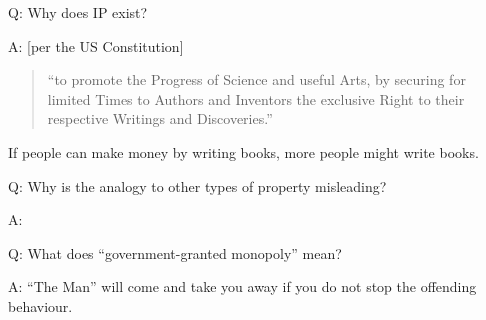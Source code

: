 \begin{frame}
\Large
\begin{changemargin}{0.5cm}
Q: Why does IP exist?

\noindent
A: [per the US Constitution]
\begin{quote}
``to promote the Progress of Science and useful Arts, by securing for limited Times to Authors and Inventors the exclusive Right to their respective Writings and Discoveries.''
\end{quote}

\noindent
If people can make money by writing books, more people might write books.
\end{changemargin}
\end{frame}

\begin{frame}
\large
\begin{changemargin}{0.5cm}
\noindent
Q: Why is the analogy to other types of property misleading?

\noindent
A:

\end{changemargin}
\end{frame}


\begin{frame}
\Large
\begin{changemargin}{1.5cm}
\noindent
Q: What does ``government-granted monopoly'' mean?

\noindent
A: ``The Man'' will come and take you away if you do
not stop the offending behaviour.
\end{changemargin}
\end{frame}


